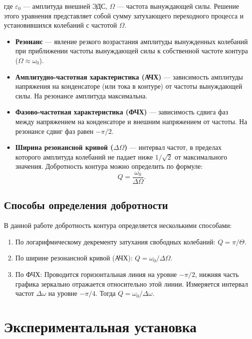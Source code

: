 \documentclass[a4paper]{article}
\begin{document}
где $\varepsilon_0$ — амплитуда внешней ЭДС, $\Omega$ — частота вынуждающей силы. Решение этого уравнения представляет собой сумму затухающего переходного процесса и установившихся колебаний с частотой $\Omega$.
\begin{itemize}
\item \textbf{Резонанс} — явление резкого возрастания амплитуды вынужденных колебаний при приближении частоты вынуждающей силы к собственной частоте контура ($\Omega \approx \omega_0$).

    \item \textbf{Амплитудно-частотная характеристика (АЧХ)} — зависимость амплитуды напряжения на конденсаторе (или тока в контуре) от частоты вынуждающей силы. На резонансе амплитуда максимальна.

    \item \textbf{Фазово-частотная характеристика (ФЧХ)} — зависимость сдвига фаз между напряжением на конденсаторе и внешним напряжением от частоты. На резонансе сдвиг фаз равен $-\pi/2$.

    \item \textbf{Ширина резонансной кривой ($\Delta\Omega$)} — интервал частот, в пределах которого амплитуда колебаний не падает ниже $1/\sqrt{2}$ от максимального значения. Добротность контура можно определить по формуле:
    \begin{equation}
    Q = \frac{\omega_0}{\Delta\Omega}.
    \end{equation}
\end{itemize}
\subsection{Способы определения добротности}
В данной работе добротность контура определяется несколькими способами:

\begin{enumerate}
    \item По логарифмическому декременту затухания свободных колебаний: $Q = \pi / \Theta$.
    \item По ширине резонансной кривой (АЧХ): $Q = \omega_0 / \Delta\Omega$.
    \item По ФЧХ: Проводится горизонтальная линия на уровне $-\pi/2$, нижняя часть графика зеркально отражается относительно этой линии. Измеряется интервал частот $\Delta\omega$ на уровне $-\pi/4$. Тогда $Q = \omega_0 / \Delta\omega$.
\end{enumerate}

\section{Экспериментальная установка}
\end{document}
